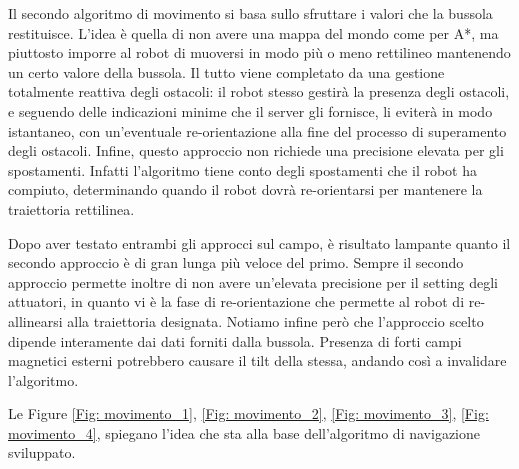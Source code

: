 \documentclass[a4paper,12pt,italian]{article}
\begin{document}
Il secondo algoritmo di movimento si basa sullo sfruttare i valori che la bussola restituisce. L'idea è quella di non avere una mappa del mondo come per A*, ma piuttosto imporre al robot di muoversi in modo più o meno rettilineo mantenendo un certo valore della bussola. Il tutto viene completato da una gestione totalmente reattiva degli ostacoli: il robot stesso gestirà la presenza degli ostacoli, e seguendo delle indicazioni minime che il server gli fornisce, li eviterà in modo istantaneo, con un'eventuale re-orientazione alla fine del processo di superamento degli ostacoli. Infine, questo approccio non richiede una precisione elevata per gli spostamenti. Infatti l'algoritmo tiene conto degli spostamenti che il robot ha compiuto, determinando quando il robot dovrà re-orientarsi per mantenere la traiettoria rettilinea.

Dopo aver testato entrambi gli approcci sul campo, è risultato lampante quanto il secondo approccio è di gran lunga più veloce del primo. Sempre il secondo approccio permette inoltre di non avere un'elevata precisione per il setting degli attuatori, in quanto vi è la fase di re-orientazione che permette al robot di re-allinearsi alla traiettoria designata. Notiamo infine però che l'approccio scelto dipende interamente dai dati forniti dalla bussola. Presenza di forti campi magnetici esterni potrebbero causare il tilt della stessa, andando così a invalidare l'algoritmo.

Le Figure \ref{Fig: movimento_1}, \ref{Fig: movimento_2}, \ref{Fig: movimento_3}, \ref{Fig: movimento_4}, spiegano l'idea che sta alla base dell'algoritmo di navigazione sviluppato.
\end{document}
